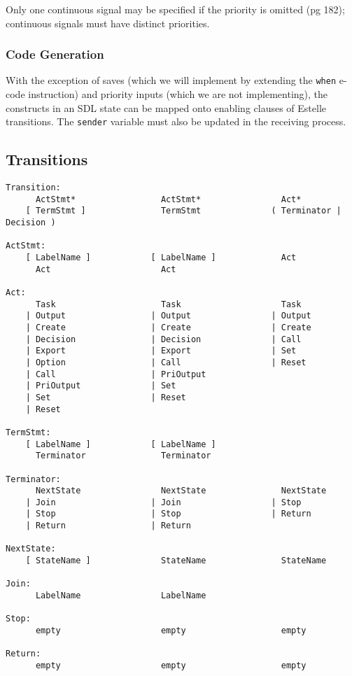 Only one continuous signal may be specified if the priority is
omitted (pg 182); continuous signals must have distinct priorities.

\subsubsection{Code Generation}

With the exception of saves (which we will implement by extending the
{\tt when} e-code instruction) and priority inputs (which we are
not implementing), the constructs in an
SDL state can be mapped onto enabling clauses of Estelle transitions.
The {\tt sender} variable must also be updated in the receiving
process.

\subsection{Transitions}

\begin{verbatim}
Transition:
      ActStmt*                 ActStmt*                Act*
    [ TermStmt ]               TermStmt              ( Terminator | Decision )

ActStmt:
    [ LabelName ]            [ LabelName ]             Act
      Act                      Act

Act:
      Task                     Task                    Task
    | Output                 | Output                | Output
    | Create                 | Create                | Create
    | Decision               | Decision              | Call
    | Export                 | Export                | Set
    | Option                 | Call                  | Reset
    | Call                   | PriOutput
    | PriOutput              | Set
    | Set                    | Reset
    | Reset

TermStmt:
    [ LabelName ]            [ LabelName ]
      Terminator               Terminator

Terminator:
      NextState                NextState               NextState
    | Join                   | Join                  | Stop
    | Stop                   | Stop                  | Return
    | Return                 | Return

NextState:
    [ StateName ]              StateName               StateName

Join:
      LabelName                LabelName

Stop:
      empty                    empty                   empty

Return:
      empty                    empty                   empty
\end{verbatim}

